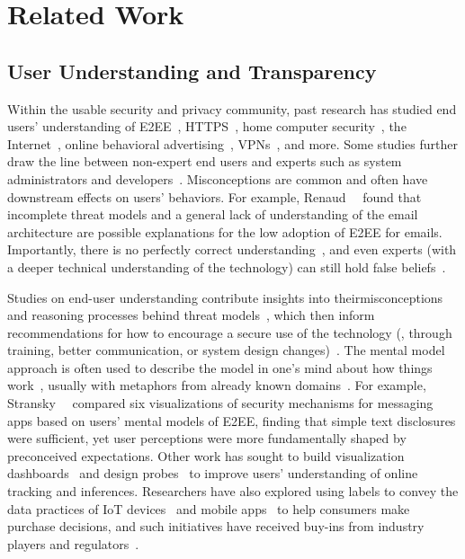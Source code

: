\section{Related Work}
\label{xhw_study::sec::background}

\subsection{User Understanding and Transparency}
Within the usable security and privacy community, past research has studied end users' understanding of \ac{E2EE}~\cite{DBLP:conf/eurousec/SchaewitzLSR21,DBLP:conf/soups/WuZ18}, HTTPS~\cite{DBLP:conf/sp/KrombholzBP0Z19}, home computer security~\cite{wash2010folk}, the Internet~\cite{kang2015my}, online behavioral advertising~\cite{DBLP:conf/cscw/YaoR017}, \acp{VPN}~\cite{DBLP:conf/uss/BinkhorstFKPL22,DBLP:conf/uss/RameshVE23}, and more. 
Some studies further draw the line between non-expert end users and experts such as system administrators and developers~\cite{DBLP:conf/uss/BinkhorstFKPL22,DBLP:conf/sp/KrombholzBP0Z19}. 
Misconceptions are common and often have downstream effects on users' behaviors. 
For example, Renaud~\etal~\cite{DBLP:conf/pet/RenaudVR14} found that incomplete threat models and a general lack of understanding of the email architecture are possible explanations for the low adoption of \ac{E2EE} for emails.
Importantly, there is no perfectly correct understanding~\cite{wash2010folk}, and even experts (with a deeper technical understanding of the technology) can still hold false beliefs~\cite{DBLP:conf/uss/BinkhorstFKPL22, DBLP:conf/sp/KrombholzBP0Z19}.

Studies on end-user understanding contribute insights into theirmisconceptions~\cite{rader2020have,DBLP:conf/soups/WuZ18,DBLP:conf/cscw/YaoR017,kang2015my} and reasoning processes behind threat models~\cite{DBLP:conf/eurousec/SchaewitzLSR21}, which then inform recommendations for how to encourage a secure use of the technology (\eg, through training, better communication, or system design changes)~\cite{DBLP:conf/uss/BinkhorstFKPL22}. 
The mental model approach is often used to describe the model in one's mind about how things work~\cite{wash2010folk}, usually with metaphors from already known domains~\cite{DBLP:journals/ijmms/StaggersN93}. 
For example, Stransky~\etal~\cite{DBLP:conf/soups/StranskyWSHAFWU21} compared six visualizations of security mechanisms for messaging apps based on users' mental models of \ac{E2EE}, finding that simple text disclosures were sufficient, yet user perceptions were more fundamentally shaped by preconceived expectations. 
Other work has sought to build visualization dashboards~\cite{DBLP:journals/popets/ReitingerWMU24,DBLP:journals/popets/FarkeBGA24} and design probes~\cite{DBLP:journals/imwut/BarbosaWUW21} to improve users' understanding of online tracking and inferences. 
Researchers have also explored using labels to convey the data practices of \ac{IoT} devices~\cite{DBLP:journals/ieeesp/NaeiniDAC22} and mobile apps~\cite{DBLP:conf/soups/ZhangKN0C24} to help consumers make purchase decisions, and such initiatives have received buy-ins from industry players and regulators~\cite{DBLP:journals/cacm/CranorAN24}.

